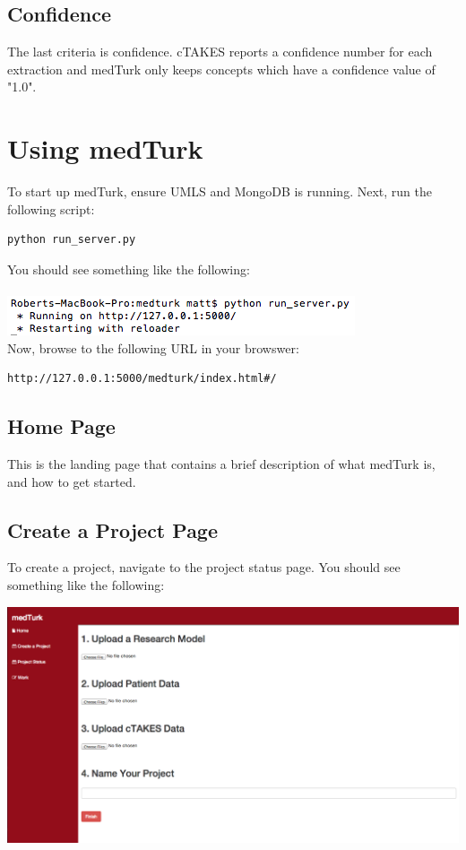 \documentclass{book}
\begin{document}
\subsection*{Confidence}
The last criteria is confidence. cTAKES reports a confidence number for each extraction and medTurk only keeps concepts which have a confidence value of "1.0".



\section{Using medTurk}
To start up medTurk, ensure UMLS and MongoDB is running. Next, run the following script:

\begin{verbatim}
python run_server.py
\end{verbatim}
You should see something like the following:
\\
\\
\includegraphics[scale=0.8]{run_server.png}~  \\[1cm]
Now, browse to the following URL in your browswer:

\begin{verbatim}
http://127.0.0.1:5000/medturk/index.html#/
\end{verbatim}

\subsection*{Home Page}
This is the landing page that contains a brief description of what medTurk is, and how to get started.

\subsection*{Create a Project Page}
To create a project, navigate to the project status page. You should see something like the following:

\includegraphics[scale=0.3]{create.png}~  \\[1cm]
\end{document}
